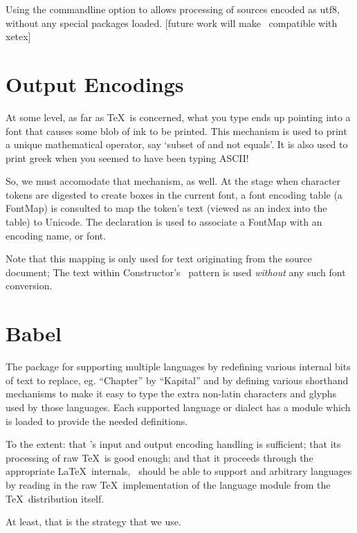 \documentclass{book}
\begin{document}
Using the commandline option  to  allows
processing of sources encoded as utf8, without any special packages loaded.
[future work will make \LaTeXML\ compatible with xetex]

\section{Output Encodings}\label{localization.outputencodings}
At some level, as far as \TeX\ is concerned, what you type ends up pointing into a font
that causes some blob of ink to be printed. This mechanism is used to print
a unique mathematical operator, say `subset of and not equals'.  It is also used
to print greek when you seemed to have been typing ASCII!

So, we must accomodate that mechanism, as well.
At the stage when character tokens are digested to create boxes in the current font,
a font encoding table (a FontMap) is consulted to map the token's text (viewed as an
index into the table) to Unicode.  The declaration  is used to associate
a FontMap with an encoding name, or font.

Note that this mapping is only used for text originating from the source
document; The text within Constructor's \XML\ pattern is used \emph{without} any such font conversion.

\section{Babel}\label{localization.babel}
The  package for supporting multiple languages by redefining various
internal bits of text to replace, eg. ``Chapter'' by ``Kapital'' and by
defining various shorthand mechanisms to make it easy to type the extra
non-latin characters and glyphs used by those languages.  Each supported
language or dialect has a module which is loaded to provide the needed definitions.

To the extent: that \LaTeXML's input and output encoding handling is sufficient;
that its processing of raw \TeX\ is good enough; and that it proceeds
through the appropriate \LaTeX\ internals, \LaTeXML\ should be able to
support  and arbitrary languages by reading in the raw \TeX\
implementation of the language module from the \TeX\ distribution itself.

At least, that is the strategy that we use.

\end{document}
